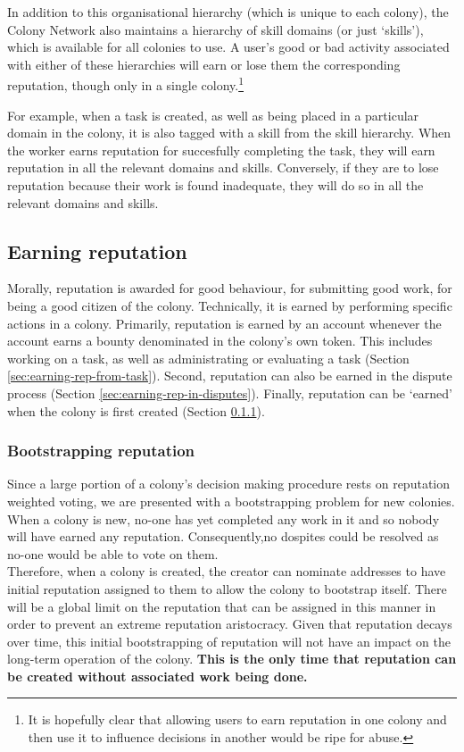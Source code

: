 In addition to this organisational hierarchy (which is unique to each colony), the Colony Network also maintains a hierarchy of skill domains (or just `skills'), which is available for all colonies to use. A user's good or bad activity associated with either of these hierarchies will earn or lose them the corresponding reputation, though only in a single colony.\footnote{It is hopefully clear that allowing users to earn reputation in one colony and then use it to influence decisions in another would be ripe for abuse.}

For example, when a task is created, as well as being placed in a particular domain in the colony, it is also tagged with a skill from the skill hierarchy. When the worker earns reputation for succesfully completing the task, they will earn reputation in all the relevant domains and skills. Conversely, if they are to lose reputation because their work is found inadequate, they will do so in all the relevant domains and skills.

\subsection{Earning reputation}\label{sec:earning-rep}
Morally, reputation is awarded for good behaviour, for submitting good work, for being a good citizen of the colony. Technically, it is earned by performing specific actions in a colony. Primarily, reputation is earned by an account whenever the account earns a bounty denominated in the colony's own token. This includes working on a task, as well as administrating or evaluating a task (Section \ref{sec:earning-rep-from-task}). Second, reputation can also be earned in the dispute process (Section \ref{sec:earning-rep-in-disputes}). Finally, reputation can be `earned' when the colony is first created (Section \ref{sec:bootstrapping-rep}).

\subsubsection{Bootstrapping reputation}\label{sec:bootstrapping-rep}
Since a large portion of a colony's decision making procedure rests on reputation weighted voting, we are presented with a bootstrapping problem for new colonies.
When a colony is new, no-one has yet completed any work in it and so nobody will have earned any reputation. Consequently,no dospites could be resolved as no-one would be able to vote on them. \\
Therefore, when a colony is created, the creator can nominate addresses to have initial reputation assigned to them to allow the colony to bootstrap itself. There will be a global limit on the reputation that can be assigned in this manner in order to prevent an extreme reputation aristocracy. Given that reputation decays over time, this initial bootstrapping of reputation will not have an impact on the long-term operation of the colony. \textbf{This is the only time that reputation can be created without associated work being done.}

